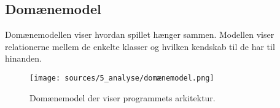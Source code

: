 \subsection{Domænemodel}
Domænemodellen viser hvordan spillet hænger sammen. Modellen viser relationerne mellem de enkelte klasser og hvilken kendskab til de har til hinanden. 

\begin{figure}[!hb]
    \centering
    \texttt{[image: sources/5\_analyse/domænemodel.png]}
    \caption{Domænemodel der viser programmets arkitektur.}
    \label{fig:DM1}
\end{figure}




